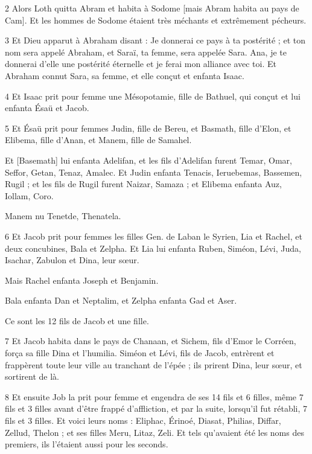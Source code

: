 \par 2 Alors Loth quitta Abram et habita à Sodome [mais Abram habita au pays de Cam]. Et les hommes de Sodome étaient très méchants et extrêmement pécheurs.

\par 3 Et Dieu apparut à Abraham disant : Je donnerai ce pays à ta postérité ; et ton nom sera appelé Abraham, et Saraï, ta femme, sera appelée Sara. Ana, je te donnerai d'elle une postérité éternelle et je ferai mon alliance avec toi. Et Abraham connut Sara, sa femme, et elle conçut et enfanta Isaac.

\par 4 Et Isaac prit pour femme une Mésopotamie, fille de Bathuel, qui conçut et lui enfanta Ésaü et Jacob.

\par 5 Et Ésaü prit pour femmes Judin, fille de Bereu, et Basmath, fille d'Elon, et Elibema, fille d'Anan, et Manem, fille de Samahel.

\par Et [Basemath] lui enfanta Adelifan, et les fils d'Adelifan furent Temar, Omar, Seffor, Getan, Tenaz, Amalec. Et Judin enfanta Tenacis, Ieruebemas, Bassemen, Rugil ; et les fils de Rugil furent Naizar, Samaza ; et Elibema enfanta Auz, Iollam, Coro.

\par Manem nu Tenetde, Thenatela.

\par 6 Et Jacob prit pour femmes les filles Gen. de Laban le Syrien, Lia et Rachel, et deux concubines, Bala et Zelpha. Et Lia lui enfanta Ruben, Siméon, Lévi, Juda, Isachar, Zabulon et Dina, leur sœur.

\par Mais Rachel enfanta Joseph et Benjamin.

\par Bala enfanta Dan et Neptalim, et Zelpha enfanta Gad et Aser.

\par Ce sont les 12 fils de Jacob et une fille.

\par 7 Et Jacob habita dans le pays de Chanaan, et Sichem, fils d'Emor le Corréen, força sa fille Dina et l'humilia. Siméon et Lévi, fils de Jacob, entrèrent et frappèrent toute leur ville au tranchant de l'épée ; ils prirent Dina, leur sœur, et sortirent de là.

\par 8 Et ensuite Job la prit pour femme et engendra de ses 14 fils et 6 filles, même 7 fils et 3 filles avant d'être frappé d'affliction, et par la suite, lorsqu'il fut rétabli, 7 fils et 3 filles. Et voici leurs noms : Eliphac, Érinoé, Diasat, Philias, Diffar, Zellud, Thelon ; et ses filles Meru, Litaz, Zeli. Et tels qu'avaient été les noms des premiers, ils l'étaient aussi pour les seconds.

